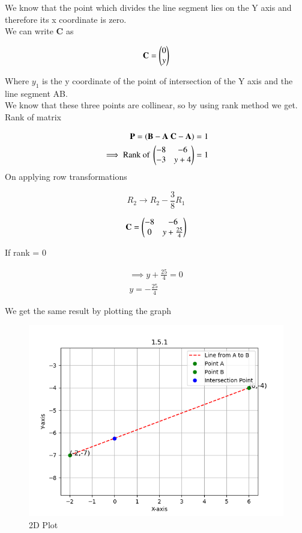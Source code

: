 \documentclass[journal]{IEEEtran}
\begin{document}
We know that the point which divides the line segment lies on the Y axis and therefore its x coordinate is zero.\\

We can write \textbf{C} as 

\begin{align}
    \mathbf{C} = \begin{pmatrix}0 \\ y\end{pmatrix}
    \label{0.3}
\end{align}

Where $y_1$ is the y coordinate of the point of intersection of the Y axis and the line segment AB.\\
We know that these three points are collinear, so by using rank method we get. Rank of matrix 

\begin{align}
    \textbf{P} = (\textbf{B}-\textbf{A} \text{ } \textbf{C}-\textbf{A}) = 1 \\
    \implies \text{Rank of } \begin{pmatrix}-8 & -6 \\ -3 & y+4\end{pmatrix} = 1
    \label{0.4}
\end{align}
On applying row transformations

$$ R_2 \rightarrow R_2 - \frac{3}{8}R_1$$

\begin{align}
    \textbf{C} = \begin{pmatrix}-8 & -6 \\ 0 & y+\frac{25}{4}\end{pmatrix}\\
\end{align}

If rank = 0

\begin{align}
    \implies y+\frac{25}{4} = 0\\
    y = -\frac{25}{4}
\end{align}



We get the same result by plotting the graph

\begin{figure}[H]
    \centering
    \includegraphics[width=1.1\columnwidth]{figs/fig1.png}
    \caption{2D Plot}
    \label{fig:placeholder}
\end{figure}
\end{document}
